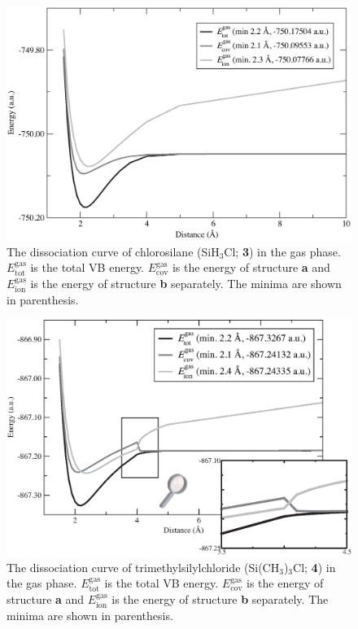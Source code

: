 \begin{figure}[htbp]
\begin{center}
\includegraphics[scale=0.55]{dissociation/figures/sih3cl_g.eps}
\end{center}
\caption{The dissociation curve of chlorosilane (SiH$_3$Cl; \textbf{3}) in the gas phase. $E_\mathrm{tot}^\mathrm{gas}$ is the total VB energy. $E_\mathrm{cov}^\mathrm{gas}$ is the energy of structure \textbf{a} and $E_\mathrm{ion}^\mathrm{gas}$ is the energy of structure \textbf{b} separately. The minima are shown in parenthesis.}
\label{ch3.fig.sih3cl}
\end{figure}
\begin{figure}[hbtp]
\begin{center}
\includegraphics[scale=0.70]{dissociation/figures/c3h9sicl_g.eps}
\end{center}
\caption{The dissociation curve of trimethylsilylchloride (Si(CH$_3$)$_3$Cl; \textbf{4}) in the gas phase. $E_\mathrm{tot}^\mathrm{gas}$ is the total VB energy. $E_\mathrm{cov}^\mathrm{gas}$ is the energy of structure \textbf{a} and $E_\mathrm{ion}^\mathrm{gas}$ is the energy of structure \textbf{b} separately. The minima are shown in parenthesis.}
\label{ch3.fig.c3h9sicl}
\end{figure}
